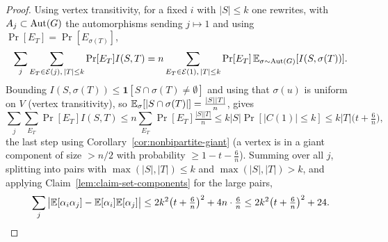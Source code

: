 \begin{proof}
  Using vertex transitivity, for a fixed $i$ with $|S| \le k$ one rewrites, with
  $A_j \subset \operatorname{Aut}(G)$ the automorphisms sending $j \mapsto 1$ and using
  $\Pr[E_T] = \Pr[E_{\sigma(T)}]$,
  \[
    \sum_{j}\sum_{\substack{E_T \in \mathcal{E}(j),\, |T| \le k}} \Pr[E_T] I(S,T)
      = n \sum_{\substack{E_T \in \mathcal{E}(1),\, |T| \le k}}
        \Pr[E_T]\, \mathbb{E}_{\sigma \sim \operatorname{Aut}(G)}[I(S, \sigma(T))] .
  \]
  Bounding $I(S,\sigma(T)) \le \mathbf{1}[S \cap \sigma(T) \neq \emptyset]$ and
  using that $\sigma(u)$ is uniform on $V$ (vertex transitivity), so
  $\mathbb{E}_{\sigma}[|S \cap \sigma(T)|] = \tfrac{|S||T|}{n}$, gives
  \[
    \sum_{j}\sum_{E_T} \Pr[E_T] I(S,T)
      \le n \sum_{E_T} \Pr[E_T]\tfrac{|S||T|}{n}
      \le k|S|\Pr[|C(1)| \le k]
      \le k|T|\big(t + \tfrac{6}{n}\big),
  \]
  the last step using Corollary~\ref{cor:nonbipartite-giant} (a vertex is in a
  giant component of size $> n/2$ with probability $\ge 1 - t - \tfrac{6}{n}$).
  Summing over all $j$, splitting into pairs with $\max(|S|,|T|) \le k$ and
  $\max(|S|,|T|) > k$, and applying Claim~\ref{lem:claim-set-components} for the
  large pairs,
  \[
    \sum_j \big|\mathbb{E}[\alpha_i\alpha_j] - \mathbb{E}[\alpha_i]\mathbb{E}[\alpha_j]\big|
      \le 2 k^2 \big(t + \tfrac{6}{n}\big)^2 + 4n\cdot\tfrac{6}{n}
      \le 2k^2\big(t + \tfrac{6}{n}\big)^2 + 24 . \qedhere
  \]
\end{proof}

